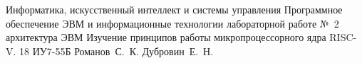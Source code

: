 \documentclass{bmstu}
\begin{document}
\makereporttitle
{Информатика, искусственный интеллект и системы управления} %
{Программное обеспечение ЭВМ и информационные технологии} %
{лабораторной работе №~2} %
{архитектура ЭВМ} %
{Изучение принципов работы микропроцессорного ядра RISC-V.} %
{18} %
{ИУ7-55Б} %
{Романов~С.~К.} %
{Дубровин~Е.~Н.} %





%
\end{document}
